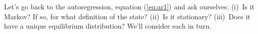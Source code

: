 \documentclass[11pt]{article}
\begin{document}
\begin{comment}
Note that we've switched from $z_t$ to $x_t$ here.
In this case we use the letter $x$ to refer to both
the state and a specific random variable that depends on the state.
It's similar to our treatment of random variables earlier,
where the random variable is a function of the state, but in most cases
we could ignore the latter.
Here it's more complicated.
We'll see examples shortly in which
$x_t$ remains the random variable of interest but the state $z_t$ is a more
complicated object.

It's important to be clear about what we know and when we know it.
If we go back to the event tree, we usually assume that we know where
we are.
If we've experienced a history $z^t$, then we know that,
and therefore know our current location or node in the tree.
Here we make a similar assumption:  that we know all the
$x$'s and $w$'s up through date $t$, but do not know their future values.

Since each $w_t$ is independent of every other one,
their covariances are
\begin{eqnarray*}
    \mbox{Cov} (w_t, w_{t-k}) \;\;=\;\; E (w_t w_{t-k}) &=&
            \left\{
            \begin{array}{l}
            1  \mbox{ if } k=0  \\
            0  \mbox{ otherwise}.
            \end{array}
            \right.
\end{eqnarray*}
That is, the expectation of ``cross terms'' is zero.
These conditions define the $w_t$'s as having no dynamics:
what happens at one date is independent of all other dates.
Therefore any dynamics must come from the rest of the equation ---
in this case the $x_t$ terms.
\end{comment}

Let's go back to the autoregression, equation (\ref{eq:ar1})
and ask ourselves:  (i)~Is it Markov?  If so, for what definition of the state?
(ii)~Is it stationary?
(iii)~Does it have a unique equilibrium distribution?
We'll consider each in turn.
\end{document}
